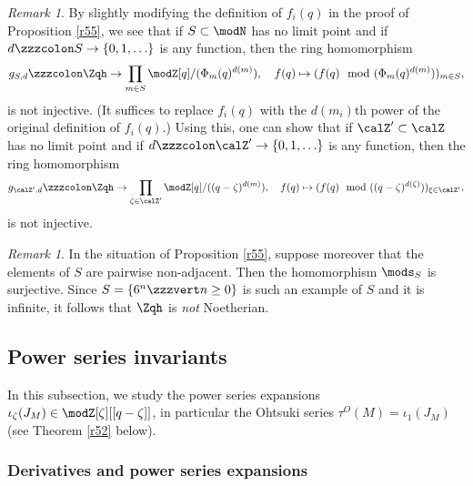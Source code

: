 \documentclass{amsart}
\numberwithin{equation}{section}
\numberwithin{figure}{section}
\theoremstyle{plain}
\theoremstyle{definition}
\theoremstyle{remark}
\newtheorem{remark}[theorem]{Remark}
\begin{document}
\begin{remark}
  \label{r43}
  By slightly modifying the definition of $f_i(q)$ in the proof of
  Proposition \ref{r55}, we see that if $S\subset \modN $ has no limit point and
  if $d\zzzcolon S\rightarrow \{0,1,\ldots \}$ is any function, then the ring homomorphism
  \begin{equation*}
    g_{S,d}\zzzcolon \Zqh\rightarrow \prod_{m\in S}\modZ [q]/(\Phi _m(q)^{d(m)}),\quad
    f(q)\mapsto (f(q)\mod(\Phi _m(q)^{d(m)}))_{m\in S},
  \end{equation*}
  is not injective.  (It suffices to replace $f_i(q)$ with the
  $d(m_i)$th power of the original definition of $f_i(q)$.)  Using
  this, one can show that if $\calZ'\subset \calZ$ has no limit point and if
  $d\zzzcolon \calZ'\rightarrow \{0,1,\ldots \}$ is any function, then the ring homomorphism
  \begin{equation*}
    g_{\calZ',d}\zzzcolon \Zqh\rightarrow \prod_{\zeta \in \calZ'}\modZ [q]/((q-\zeta )^{d(m)}),\quad
    f(q)\mapsto (f(q)\mod((q-\zeta )^{d(\zeta )}))_{\xi \in \calZ'},
  \end{equation*}
  is not injective.
\end{remark}

\begin{remark}
  \label{r74}
  In the situation of Proposition \ref{r55}, suppose moreover that the
  elements of $S$ are pairwise non-adjacent.  Then the homomorphism
  $\mods _S$ is surjective.  Since $S=\{6^n\zzzvert n\ge 0\}$ is such an example of
  $S$ and it is infinite, it follows that $\Zqh$ is {\em not}
  Noetherian.
\end{remark}

\subsection{Power series invariants}
\label{sec:power-seri-expans}

In this subsection, we study the power series expansions
$\iota _\zeta (J_M)\in \modZ [\zeta ][[q-\zeta ]]$, in particular the Ohtsuki series
$\tau ^O(M)=\iota _1(J_M)$ (see Theorem \ref{r52} below).

\subsubsection{Derivatives and power series expansions}
\label{sec:power-seri-expans-1}
\end{document}
